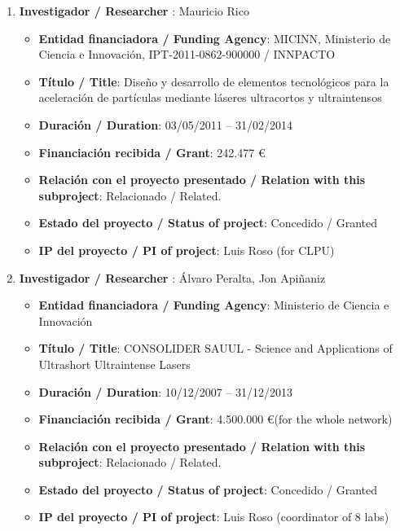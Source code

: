 \begin{enumerate}
\item {\bf Investigador / Researcher }: Mauricio Rico
\begin{itemize}
	\item {\bf Entidad financiadora / Funding Agency}: MICINN, Ministerio de Ciencia e Innovaci\'on, IPT-2011-0862-900000     / INNPACTO
	\item {\bf Título / Title}: Dise\~no y desarrollo de elementos tecnol\'ogicos para la aceleraci\'on de part\'iculas mediante l\'aseres ultracortos y ultraintensos
	\item {\bf Duración / Duration}: 03/05/2011 -- 31/02/2014
	\item {\bf Financiación recibida / Grant}: 242.477 \euro 
	\item {\bf Relación con el proyecto presentado / Relation with this subproject}: Relacionado / Related. 
	\item {\bf Estado del proyecto / Status of project}: Concedido / Granted
	\item {\bf IP del proyecto / PI of project}: Luis Roso (for CLPU)
\end{itemize}

\item {\bf Investigador / Researcher }: \'Alvaro Peralta, Jon Api\~naniz
\begin{itemize}
	\item {\bf Entidad financiadora / Funding Agency}: Ministerio de Ciencia e Innovaci\'on
	\item {\bf Título / Title}: CONSOLIDER SAUUL - Science and Applications of Ultrashort Ultraintense Lasers
	\item {\bf Duración / Duration}: 10/12/2007 -- 31/12/2013
	\item {\bf Financiación recibida / Grant}: 4.500.000 \euro (for the whole network)
	\item {\bf Relación con el proyecto presentado / Relation with this subproject}: Relacionado / Related. 
	\item {\bf Estado del proyecto / Status of project}: Concedido / Granted
	\item {\bf IP del proyecto / PI of project}: Luis Roso (coordinator of 8 labs)
\end{itemize}

\end{enumerate}
